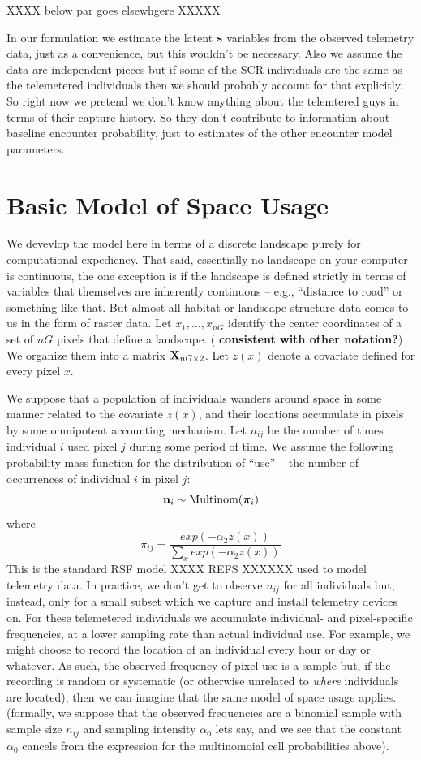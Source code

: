 XXXX below par goes elsewhgere XXXXX

In our formulation we estimate the latent ${\bf s}$ variables from the observed telemetry
data, just as a convenience, but this wouldn't be necessary.
Also we assume the data are independent pieces but if some of the SCR
individuals are the same as the telemetered individuals then we should
probably account for that explicitly. So right now we pretend we don't
know anything about the telemtered guys in terms of their capture
history. So they don't contribute to information about baseline
encounter probability, just to estimates of the other encounter model
parameters. 



\section{Basic Model of Space Usage}

We devevlop the model here in terms of a discrete landscape purely for
computational expediency. That said, essentially no landscape on your
computer is continuous, the one exception is if the landscape is
defined strictly in terms of variables that themselves are inherently
continuous -- e.g., ``distance to road'' or something like that.  But
almost all habitat or landscape structure data comes to us in the form
of raster data.  Let $x_{1},\ldots,x_{nG}$ identify the center
coordinates of a set of $nG$ pixels that define a landscape. ({\bf
  consistent with other notation?}) We organize them into a matrix
${\bf X}_{nG \times 2}$. 
Let $z(x)$ denote a covariate defined for every pixel $x$. 

We suppose that a population of individuals wanders around space in
some manner related to the covariate $z(x)$, and their locations
accumulate in pixels by some omnipotent accounting mechanism. Let
$n_{ij}$ be the number of times individual $i$ used pixel $j$ during
some period of time. 
We assume the
following probability mass function 
for the distribution of  ``use'' -- the number of
occurrences of individual $i$ in pixel $j$:
\[
{\bf n}_{i} \sim \mbox{Multinom}({\bm \pi}_{i})
\]
where
\[
 \pi_{ij} = \frac{ exp( -\alpha_{2} z(x) ) }{ \sum_{x} exp(-\alpha_{2} z(x))} 
\]
This is the standard RSF
model XXXX REFS XXXXXX used to model telemetry data. 
In practice, we don't get to observe $n_{ij}$ for all individuals but,
instead, only for a small subset which we capture and install
telemetry devices on.
For these telemetered individuals
we accumulate individual- and pixel-specific frequencies,
 at a lower sampling rate than actual individual use. For
example, we might choose to record the location of an individual every
hour or day or whatever. As such, the observed frequency of pixel use
is a sample but, if the recording is random or systematic (or
otherwise unrelated to {\it where} individuals are located), then we
can imagine that the same model of space usage applies. (formally, we
suppose that the observed frequencies are a binomial sample with
sample size $n_{ij}$ and sampling intensity $\alpha_{0}$ lets say, and
we see that the constant $\alpha_{0}$ cancels from the expression for
the multinomoial cell probabilities above). 

